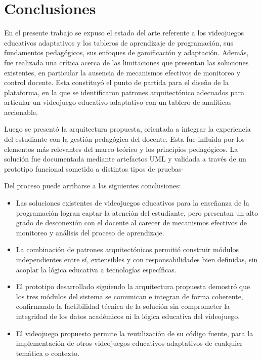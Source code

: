 \chapter*{Conclusiones}

En el presente trabajo se expuso el estado del arte referente a los videojuegos 
educativos adaptativos y los tableros de aprendizaje de programación, sus 
fundamentos pedagógicos, sus enfoques de gamificación y adaptación. Además, fue 
realizada una crítica acerca de las limitaciones que presentan las soluciones 
existentes, en particular la ausencia de mecanismos efectivos de monitoreo y control 
docente. Esta constituyó el punto de partida para el diseño de la plataforma, en la que se identificaron patrones arquitectónico adecuados para 
articular un videojuego educativo adaptativo con un tablero de analíticas accionable.

Luego se presentó la arquitectura propuesta, orientada a integrar la experiencia del 
estudiante con la gestión pedagógica del docente. Esta fue influida por los elementos 
más relevantes del marco teórico y los principios pedagógicos. La solución fue documentada mediante 
artefactos UML y validada a través de un prototipo funcional sometido a distintos tipos de pruebas-

Del proceso puede arribarse a las siguientes conclusiones:

\begin{itemize}
	
	\item Las soluciones existentes de videojuegos educativos para la enseñanza de
	la programación logran captar la atención del estudiante, pero presentan un alto
	grado de desconexión con el docente al carecer de mecanismos efectivos de
	monitoreo y análisis del proceso de aprendizaje.
	
	\item La combinación de patrones arquitectónicos permitió construir
	módulos independientes entre sí, extensibles y con responsabilidades bien
	definidas, sin acoplar la lógica educativa a tecnologías específicas.
	
	\item El prototipo desarrollado siguiendo la arquitectura propuesta demostró que
	los tres módulos del sistema se comunican e integran de forma coherente,
	confirmando la factibilidad técnica de la solución sin comprometer la integridad
	de los datos académicos ni la lógica educativa del videojuego.
	
	\item El videojuego propuesto permite la reutilización de su código fuente, para la implementación de otros videojuegos educativos adaptativos de cualquier temática o contexto.
	
\end{itemize}